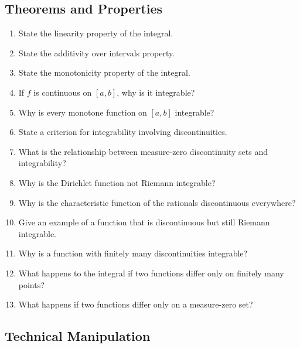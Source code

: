 \subsection{Theorems and Properties}

\begin{enumerate}[resume]
  \item State the linearity property of the integral.
  \item State the additivity over intervals property.
  \item State the monotonicity property of the integral.
  \item If $f$ is continuous on $[a,b]$, why is it integrable?
  \item Why is every monotone function on $[a,b]$ integrable?
  \item State a criterion for integrability involving discontinuities.
  \item What is the relationship between measure-zero discontinuity sets and integrability?
  \item Why is the Dirichlet function not Riemann integrable?
  \item Why is the characteristic function of the rationals discontinuous everywhere?
  \item Give an example of a function that is discontinuous but still Riemann integrable.
  \item Why is a function with finitely many discontinuities integrable?
  \item What happens to the integral if two functions differ only on finitely many points?
  \item What happens if two functions differ only on a measure-zero set?
\end{enumerate}

\subsection{Technical Manipulation}

